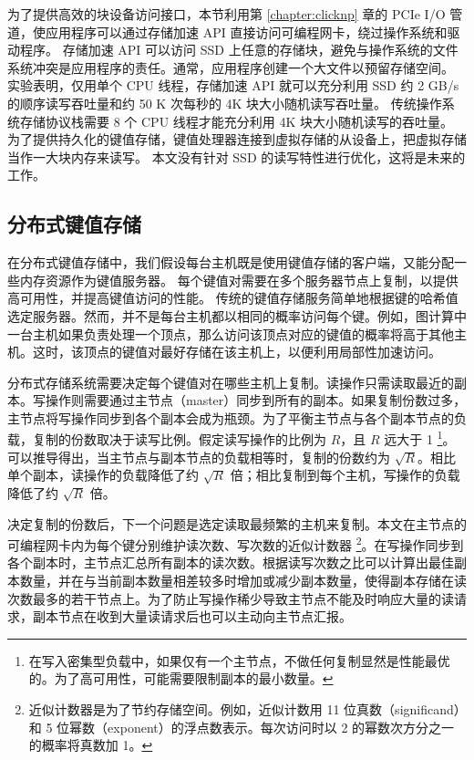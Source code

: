 为了提供高效的块设备访问接口，本节利用第 \ref{chapter:clicknp} 章的 PCIe I/O 管道，使应用程序可以通过存储加速 API 直接访问可编程网卡，绕过操作系统和驱动程序。
存储加速 API 可以访问 SSD 上任意的存储块，避免与操作系统的文件系统冲突是应用程序的责任。通常，应用程序创建一个大文件以预留存储空间。
实验表明，仅用单个 CPU 线程，存储加速 API 就可以充分利用 SSD 约 2 GB/s 的顺序读写吞吐量和约 50 K 次每秒的 4K 块大小随机读写吞吐量。
传统操作系统存储协议栈需要 8 个 CPU 线程才能充分利用 4K 块大小随机读写的吞吐量。
为了提供持久化的键值存储，键值处理器连接到虚拟存储的从设备上，把虚拟存储当作一大块内存来读写。
本文没有针对 SSD 的读写特性进行优化，这将是未来的工作。






\subsection{分布式键值存储}

在分布式键值存储中，我们假设每台主机既是使用键值存储的客户端，又能分配一些内存资源作为键值服务器。
每个键值对需要在多个服务器节点上复制，以提供高可用性，并提高键值访问的性能。
传统的键值存储服务简单地根据键的哈希值选定服务器。然而，并不是每台主机都以相同的概率访问每个键。例如，图计算中一台主机如果负责处理一个顶点，那么访问该顶点对应的键值的概率将高于其他主机。这时，该顶点的键值对最好存储在该主机上，以便利用局部性加速访问。

分布式存储系统需要决定每个键值对在哪些主机上复制。读操作只需读取最近的副本。写操作则需要通过主节点（master）同步到所有的副本。如果复制份数过多，主节点将写操作同步到各个副本会成为瓶颈。为了平衡主节点与各个副本节点的负载，复制的份数取决于读写比例。假定读写操作的比例为 $R$，且 $R$ 远大于 1 \footnote{在写入密集型负载中，如果仅有一个主节点，不做任何复制显然是性能最优的。为了高可用性，可能需要限制副本的最小数量。}。可以推导得出，当主节点与副本节点的负载相等时，复制的份数约为 $\sqrt{R}$。相比单个副本，读操作的负载降低了约 $\sqrt{R}$ 倍；相比复制到每个主机，写操作的负载降低了约 $\sqrt{R}$ 倍。

决定复制的份数后，下一个问题是选定读取最频繁的主机来复制。本文在主节点的可编程网卡内为每个键分别维护读次数、写次数的近似计数器 \footnote{近似计数器是为了节约存储空间。例如，近似计数用 11 位真数（significand）和 5 位幂数（exponent）的浮点数表示。每次访问时以 2 的幂数次方分之一的概率将真数加 1。}。在写操作同步到各个副本时，主节点汇总所有副本的读次数。根据读写次数之比可以计算出最佳副本数量，并在与当前副本数量相差较多时增加或减少副本数量，使得副本存储在读次数最多的若干节点上。为了防止写操作稀少导致主节点不能及时响应大量的读请求，副本节点在收到大量读请求后也可以主动向主节点汇报。

